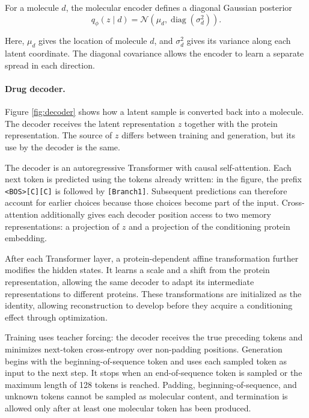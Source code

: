 \documentclass[a4paper,12pt]{article}
\newcommand{\Ncal}{\mathcal{N}}
\begin{document}
For a molecule $d$, the molecular encoder defines a diagonal Gaussian posterior
\begin{equation*}
    q_\phi(z\mid d)
    =
    \Ncal\!\left(
    \mu_d,
    \operatorname{diag}(\sigma_d^2)
    \right).
\end{equation*}

Here, $\mu_d$ gives the location of molecule $d$, and $\sigma_d^2$ gives its variance along each latent coordinate. The diagonal covariance allows the encoder to learn a separate spread in each direction.

\paragraph{Drug decoder.}

Figure \ref{fig:decoder} shows how a latent sample is converted back into a molecule. The decoder receives the latent representation $z$ together with the protein representation. The source of $z$ differs between training and generation, but its use by the decoder is the same.

The decoder is an autoregressive Transformer with causal self-attention. Each next token is predicted using the tokens already written: in the figure, the prefix \texttt{<BOS>[C][C]} is followed by \texttt{[Branch1]}. Subsequent predictions can therefore account for earlier choices because those choices become part of the input. Cross-attention additionally gives each decoder position access to two memory representations: a projection of $z$ and a projection of the conditioning protein embedding.

After each Transformer layer, a protein-dependent affine transformation further modifies the hidden states. It learns a scale and a shift from the protein representation, allowing the same decoder to adapt its intermediate representations to different proteins. These transformations are initialized as the identity, allowing reconstruction to develop before they acquire a conditioning effect through optimization.

Training uses teacher forcing: the decoder receives the true preceding tokens and minimizes next-token cross-entropy over non-padding positions. Generation begins with the beginning-of-sequence token and uses each sampled token as input to the next step. It stops when an end-of-sequence token is sampled or the maximum length of 128 tokens is reached. Padding, beginning-of-sequence, and unknown tokens cannot be sampled as molecular content, and termination is allowed only after at least one molecular token has been produced.
\end{document}
